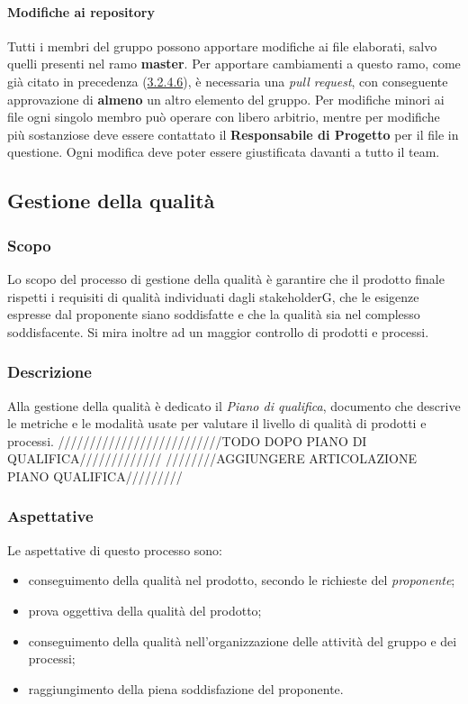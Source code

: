 \paragraph{Modifiche ai repository}
Tutti i membri del gruppo possono apportare modifiche ai file elaborati, salvo quelli presenti nel ramo \textbf{master}. Per apportare cambiamenti a questo ramo, come già citato in precedenza (\hyperref[NormeBranching]{3.2.4.6}), è necessaria una \textit{pull request}, con conseguente approvazione di \textbf{almeno} un altro elemento del gruppo.\newline
Per modifiche minori ai file ogni singolo membro può operare con libero arbitrio, mentre per modifiche più sostanziose deve essere contattato il \textbf{Responsabile di Progetto} per il file in questione.\newline
Ogni modifica deve poter essere giustificata davanti a tutto il team.
\subsection{Gestione della qualità}
\subsubsection{Scopo}
Lo scopo del processo di gestione della qualità è garantire che il prodotto finale rispetti i requisiti di qualità individuati dagli stakeholderG, che le esigenze espresse dal proponente siano soddisfatte e che la qualità sia nel complesso soddisfacente. Si mira inoltre ad un maggior controllo di prodotti e processi.
\subsubsection{Descrizione}
Alla gestione della qualità è dedicato il \textit{Piano di qualifica}, documento che descrive le metriche e le modalità usate per valutare il livello di qualità di prodotti e processi.
//////////////////////////TODO DOPO PIANO DI QUALIFICA/////////////
////////AGGIUNGERE ARTICOLAZIONE PIANO QUALIFICA/////////
\subsubsection{Aspettative}
Le aspettative di questo processo sono:
\begin{itemize}
	\item conseguimento della qualità nel prodotto, secondo le richieste del \textit{proponente};
	\item prova oggettiva della qualità del prodotto;
	\item conseguimento della qualità nell'organizzazione delle attività del gruppo e dei processi;
	\item raggiungimento della piena soddisfazione del proponente.
\end{itemize}
